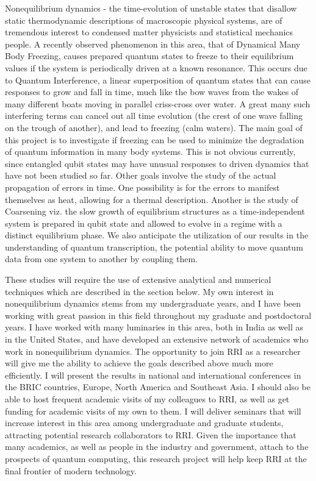 \documentclass[a4paper,9pt]{article}
\begin{document}
Nonequilibrium dynamics - the time-evolution of unstable states that disallow static thermodynamic descriptions of macroscopic physical systems, are of tremendous interest to condensed matter physicists and statistical mechanics people. A recently observed phenomenon in this area, that of Dynamical Many Body Freezing, causes prepared quantum states to freeze to their equilibrium values if the system is periodically driven at a known resonance. This occurs due to Quantum Interference, a linear superposition of quantum states that can cause responses to grow and fall in time, much like the bow waves from the wakes of many different boats moving in parallel criss-cross over water. A great many such interfering terms can cancel out all time evolution (the crest of one wave falling on the trough of another), and lead to freezing (calm waters). The main goal of this project is to investigate if freezing can be used to minimize the degradation of quantum information in many body systems. This is not obvious currently, since entangled qubit states may have unusual responses to driven dynamics that have not been studied so far. Other goals involve the study of the actual propagation of errors in time. One possibility is for the errors to manifest themselves as heat, allowing for a thermal description. Another is the study of Coarsening  viz. the slow growth of equilibrium structures as a time-independent system is prepared in qubit state and allowed to evolve in a regime with a distinct equilibrium phase. We also anticipate the utilization of our results in the understanding of quantum transcription, the potential ability to move quantum data from one system to another by coupling them. 

These studies will require the use of extensive analytical and numerical techniques which are described in the section below. My own interest in nonequilibrium dynamics stems from my undergraduate years, and I have been working with great passion in this field throughout my graduate and postdoctoral years. I have worked with many luminaries in this area, both in India as well as in the United States, and have developed an extensive network of academics who work in nonequilibrium dynamics. The opportunity to join RRI as a researcher will give me the ability to achieve the goals described above much more efficiently. I will present the results in national and international conferences in the BRIC countries, Europe, North America and Southeast Asia. I should also be able to host frequent academic visits of my colleagues to RRI, as well as get funding for academic visits of my own to them. I will deliver seminars that will increase interest in this area among undergraduate and graduate students, attracting potential research collaborators to RRI.  Given the importance that many academics, as well as people in the industry and government, attach to the prospects of quantum computing, this research project will help keep RRI at the final frontier of modern technology.
\end{document}
